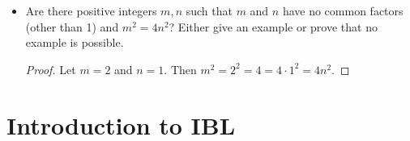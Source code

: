 \documentclass[titlepage]{article}
\theoremstyle{definition}
\begin{document}
\begin{itemize}
\begin{proof}
    \end{proof}
    \item Are there positive integers $m,n$ such that $m$ and $n$ have no common factors (other than 1) and $m^2=4n^2$? Either give an example or prove that no example is possible.
    \begin{proof}
        Let $m=2$ and $n=1$. Then $m^2=2^2=4=4\cdot 1^2=4n^2$.
    \end{proof}
\end{itemize}





\section{Introduction to IBL}
\end{document}

